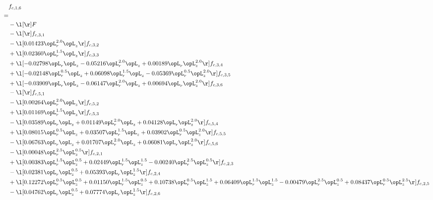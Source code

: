 \begin{alignat}{2} 
\label{eq:f_16_2} 
& f_{c,1,6} \nonumber \\ 
 = \\ 
& - \l[  \r] F \nonumber \\ 
& - \l[  \r] f_{c,3,1} \nonumber \\ 
& - \l[  0.01423 \opL_r^{2.0} \opL_z  \r] f_{c,3,2} \nonumber \\ 
& + \l[  0.02360 \opL_r^{1.5} \opL_z  \r] f_{c,3,3} \nonumber \\ 
& + \l[  -0.02798 \opL_r \opL_z   -0.05216 \opL_r^{2.0} \opL_z +  0.00189 \opL_r \opL_z^{2.0}  \r] f_{c,3,4} \nonumber \\ 
& + \l[  -0.02148 \opL_r^{0.5} \opL_z +  0.06098 \opL_r^{1.5} \opL_z   -0.05369 \opL_r^{0.5} \opL_z^{2.0}  \r] f_{c,3,5} \nonumber \\ 
& + \l[  -0.03909 \opL_r \opL_z   -0.06147 \opL_r^{2.0} \opL_z +  0.00694 \opL_r \opL_z^{2.0}  \r] f_{c,3,6} \nonumber \\ 
& - \l[  \r] f_{c,5,1} \nonumber \\ 
& - \l[  0.00264 \opL_r^{2.0} \opL_z  \r] f_{c,5,2} \nonumber \\ 
& + \l[  0.01169 \opL_r^{1.5} \opL_z  \r] f_{c,5,3} \nonumber \\ 
& - \l[  0.03589 \opL_r \opL_z +  0.01149 \opL_r^{2.0} \opL_z +  0.04128 \opL_r \opL_z^{2.0}  \r] f_{c,5,4} \nonumber \\ 
& + \l[  0.08015 \opL_r^{0.5} \opL_z +  0.03507 \opL_r^{1.5} \opL_z +  0.03902 \opL_r^{0.5} \opL_z^{2.0}  \r] f_{c,5,5} \nonumber \\ 
& - \l[  0.06763 \opL_r \opL_z +  0.01707 \opL_r^{2.0} \opL_z +  0.06081 \opL_r \opL_z^{2.0}  \r] f_{c,5,6} \nonumber \\ 
& - \l[  0.00048 \opL_r^{2.5} \opL_z^{0.5}  \r] f_{c,2,1} \nonumber \\ 
& + \l[  0.00383 \opL_r^{1.5} \opL_z^{0.5} +  0.02449 \opL_r^{1.5} \opL_z^{1.5}   -0.00240 \opL_r^{2.5} \opL_z^{0.5}  \r] f_{c,2,3} \nonumber \\ 
& - \l[  0.02381 \opL_r \opL_z^{0.5} +  0.05393 \opL_r \opL_z^{1.5}  \r] f_{c,2,4} \nonumber \\ 
& + \l[  0.12272 \opL_r^{0.5} \opL_z^{0.5} +  0.01150 \opL_r^{1.5} \opL_z^{0.5} +  0.10738 \opL_r^{0.5} \opL_z^{1.5} +  0.06409 \opL_r^{1.5} \opL_z^{1.5}   -0.00479 \opL_r^{2.5} \opL_z^{0.5} +  0.08437 \opL_r^{0.5} \opL_z^{2.5}  \r] f_{c,2,5} \nonumber \\ 
& - \l[  0.04762 \opL_r \opL_z^{0.5} +  0.07774 \opL_r \opL_z^{1.5}  \r] f_{c,2,6} \nonumber \\ 

\end{alignat}
